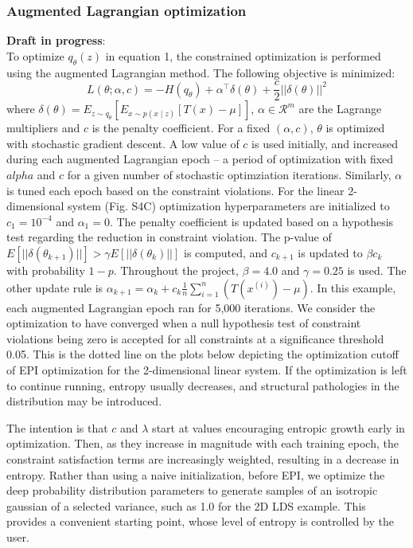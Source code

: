 \documentclass[11pt]{article}
\begin{document}
\subsubsection{Augmented Lagrangian optimization}\label{methods_AL_opt}
\textbf{Draft in progress}: \\
To optimize $q_\theta(z)$ in equation 1, the constrained optimization is performed using the augmented Lagrangian method.  The following objective is minimized:
\begin{equation}
L(\theta; \alpha, c) = -H(q_\theta) + \alpha^\top \delta(\theta) + \frac{c}{2}||\delta(\theta)||^2
\end{equation}
where $\delta(\theta) = E_{z \sim q_\theta}\left[ E_{x\sim p(x \mid z)}\left[T(x) - \mu \right] \right]$, $\alpha \in \mathcal{R}^m$ are the Lagrange multipliers and $c$ is the penalty coefficient.  For a fixed $(\alpha, c)$, $\theta$ is optimized with stochastic gradient descent.  A low value of $c$ is used initially, and increased during each augmented Lagrangian epoch -- a period of optimization with fixed $alpha$ and $c$ for a given number of stochastic optimziation iterations. Similarly, $\alpha$ is tuned each epoch based on the constraint violations.  For the linear 2-dimensional system (Fig. S4C) optimization hyperparameters are initialized to $c_1 = 10^{-4}$ and $\alpha_1 = 0$.  The penalty coefficient is updated based on a hypothesis test regarding the reduction in constraint violation.  The p-value of $E[||\delta(\theta_{k+1})||] > \gamma E[||\delta(\theta_{k})||]$ is computed, and $c_{k+1}$ is updated  to $\beta c_k$ with probability $1-p$.  Throughout the project, $\beta = 4.0$ and $\gamma = 0.25$ is used.  The other update rule is $\alpha_{k+1} = \alpha_k + c_k \frac{1}{n} \sum_{i=1}^n (T(x^{(i)}) - \mu)$.  In this example, each augmented Lagrangian epoch ran for 5,000 iterations.  We consider the optimization to have converged when a null hypothesis test of constraint violations being zero is accepted for all constraints at a significance threshold 0.05.  This is the dotted line on the plots below depicting the optimization cutoff of EPI optimization for the 2-dimensional linear system.  If the optimization is left to continue running, entropy usually decreases, and structural pathologies in the distribution may be introduced.

The intention is that $c$ and $\lambda$ start at values encouraging entropic growth early in optimization.  Then, as they increase in magnitude with each training epoch, the constraint satisfaction terms are increasingly weighted, resulting in a decrease in entropy.  Rather than using a naive initialization, before EPI, we optimize the deep probability distribution parameters to generate samples of an isotropic gaussian of a selected variance, such as 1.0 for the 2D LDS example.  This provides a convenient starting point, whose level of entropy is controlled by the user.
\end{document}
